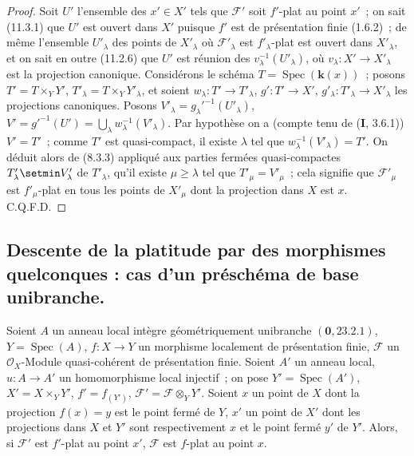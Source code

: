\begin{proof}
Soit $U'$ l'ensemble des $x'\in X'$ tels que $\mathcal F'$ soit $f'$-plat au
point $x'$~; on sait (11.3.1) que $U'$ est ouvert dans $X'$ puisque $f'$ est de
présentation finie (1.6.2)~; de même l'ensemble $U'_{\lambda}$ des points de
$X'_{\lambda}$ où $\mathcal F'_{\lambda}$ est $f'_{\lambda}$-plat est ouvert
dans $X'_{\lambda}$, et on sait en outre (11.2.6) que $U'$ est réunion des
$v_{\lambda}^{-1}(U'_{\lambda})$, où
$v_{\lambda}:X'\to X'_{\lambda}$ est la projection canonique. Considérons le
schéma $T=\operatorname{Spec}(\boldsymbol{k}(x))$~; posons $T'=T\times_Y Y'$,
$T'_{\lambda}=T\times_Y Y'_{\lambda}$, et soient
$w_{\lambda}:T'\to T'_{\lambda}$, $g':T'\to X'$,
$g'_{\lambda}:T'_{\lambda}\to X'_{\lambda}$ les projections canoniques. Posons
$V'_{\lambda}=g_{\lambda}'^{-1}(U'_{\lambda})$,
$V'=g'^{-1}(U')=\bigcup_{\lambda}w_{\lambda}^{-1}(V'_{\lambda})$. Par
hypothèse on a (compte tenu de (\textbf I, 3.6.1)) $V'=T'$~; comme $T'$ est
quasi-compact, il existe $\lambda$ tel que
$w_{\lambda}^{-1}(V'_{\lambda})=T'$. On déduit alors de (8.3.3) appliqué aux
parties fermées quasi-compactes $T'_{\lambda}\setmin V'_{\lambda}$ de
$T'_{\lambda}$, qu'il existe $\mu\geq\lambda$ tel que
$T'_{\mu}=V'_{\mu}$~; cela signifie que $\mathcal F'_{\mu}$ est
$f'_{\mu}$-plat en tous les points de $X'_{\mu}$ dont la projection dans $X$
est $x$. C.Q.F.D.
\end{proof}

\subsection{Descente de la platitude par des morphismes quelconques : cas d'un
préschéma de base unibranche.}
\label{subsection:IV.11.6-fr}

\begin{theorem}[11.6.1]
\label{IV.11.6.1-fr}
Soient $A$ un anneau local intègre géométriquement unibranche
$(\mathbf 0,23.2.1)$, $Y=\operatorname{Spec}(A)$, $f:X\to Y$ un morphisme
localement de présentation finie, $\mathcal F$ un $\mathcal O_X$-Module
quasi-cohérent de présentation finie. Soient $A'$ un anneau local,
$u:A\to A'$ un homomorphisme local injectif~; on pose
$Y'=\operatorname{Spec}(A')$, $X'=X\times_Y Y'$, $f'=f_{(Y')}$,
$\mathcal F'=\mathcal F\otimes_Y Y'$. Soient $x$ un point de $X$ dont la
projection $f(x)=y$ est le point fermé de $Y$, $x'$ un point de $X'$ dont les
projections dans $X$ et $Y'$ sont respectivement $x$ et le point fermé $y'$ de
$Y'$. Alors, si $\mathcal F'$ est $f'$-plat au point $x'$, $\mathcal F$ est
$f$-plat au point $x$.
\end{theorem}

